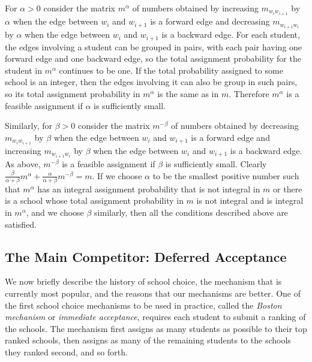 \documentclass[12pt]{article}
\theoremstyle{definition}
\begin{document}
For $\alpha > 0$ consider the matrix $m^\alpha$ of numbers obtained by
increasing $m_{w_iw_{i+1}}$ by $\alpha$ when the edge between $w_i$
and $w_{i+1}$ is a forward edge and decreasing $m_{w_{i+1}w_i}$ by
$\alpha$ when the edge between $w_i$ and $w_{i+1}$ is a backward edge.
For each student, the edges involving a student can be grouped in
pairs, with each pair having one forward edge and one backward edge,
so the total assignment probability for the student in $m^\alpha$
continues to be one.  If the total probability assigned to some school
is an integer, then the edges involving it can also be group in such
pairs, so its total assignment probability in $m^\alpha$ is the same
as in $m$.  Therefore $m^\alpha$ is a feasible assignment if $\alpha$
is sufficiently small.  

Similarly, for $\beta > 0$ consider the matrix $m^{-\beta}$ of numbers
obtained by decreasing $m_{w_iw_{i+1}}$ by $\beta$ when the edge
between $w_i$ and $w_{i+1}$ is a forward edge and increasing
$m_{w_{i+1}w_i}$ by $\beta$ when the edge between $w_i$ and $w_{i+1}$
is a backward edge.  As above, $m^{-\beta}$ is a feasible assignment
if $\beta$ is sufficiently small.  Clearly $\tfrac{\beta}{\alpha +
  \beta}m^\alpha + \tfrac{\alpha}{\alpha + \beta}m^{-\beta} = m$.  If
we choose $\alpha$ to be the smallest positive number such that
$m^\alpha$ has an integral assignment probability that is not integral
in $m$ or there is a school whose total assignment probability in $m$
is not integral and is integral in $m^\alpha$, and we choose $\beta$
similarly, then all the conditions described above are satisfied.

\subsection{The Main Competitor: Deferred Acceptance} \label{subsec:DeferredAcceptance}

We now briefly describe the history of school choice, the mechanism
that is currently most popular, and the reasons that our mechanisms
are better.  One of the first school choice mechanisms to be used in
practice, called the \emph{Boston mechanism} or \emph{immediate
acceptance}, requires each student to submit a ranking of the schools.
The mechanism first assigns as many students as possible to their top
ranked schools, then assigns as many of the remaining students to the
schools they ranked second, and so forth.
\end{document}

